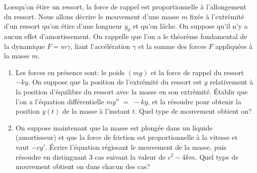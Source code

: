 
\begin{exercice}\label{exoEqsDiff0010}


Lorsqu'on étire un ressort, la force de rappel est proportionnelle à l'allongement du ressort. Nous allons décrire le mouvement d'une masse $m$ fixée à l'extrémité d'un ressort qu'on étire d'une longueur $y_0$ et qu'on lâche. On suppose qu'il n'y a aucun effet d'amortissement. On rappelle que l'on a le théorème fondamental de la dynamique $F=m\gamma$, liant l'accélération $\gamma$ et la somme des forces $F$ appliquées à la masse $m$.
\begin{enumerate}
\item Les forces en présence sont: le poids $(mg)$ et la force de rappel du ressort $-ky$. On suppose que la position de l'extrémité du ressort est $y$ relativement à la position d'équilibre du ressort avec la masse en son extrémité. Établir que l'on a l'équation différentielle $my''\;=\;-ky$, et la résoudre pour obtenir la position $y(t)$ de la masse à l'instant $t$. Quel type de mouvement obtient on?
\item On suppose maintenant que la masse est plongée dans un liquide (amortisseur) et que la force de friction est proportionnelle à la vitesse et vaut $-cy'$. Écrire l'équation régissant le mouvement de la masse, puis résoudre en distinguant 3 cas suivant la valeur de $c^2-4km$. Quel type de mouvement obtient on dans chacun des cas?
\end{enumerate}

\end{exercice}
